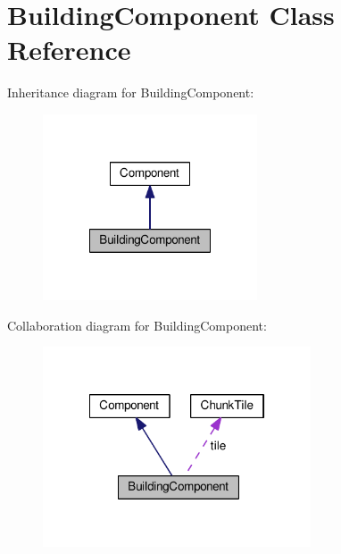 \hypertarget{classBuildingComponent}{\section{Building\-Component Class Reference}
\label{classBuildingComponent}
}


Inheritance diagram for Building\-Component\-:
\nopagebreak
\begin{figure}[H]
\begin{center}
\leavevmode
\includegraphics[width=180pt]{classBuildingComponent__inherit__graph}
\end{center}
\end{figure}


Collaboration diagram for Building\-Component\-:
\nopagebreak
\begin{figure}[H]
\begin{center}
\leavevmode
\includegraphics[width=225pt]{classBuildingComponent__coll__graph}
\end{center}
\end{figure}
